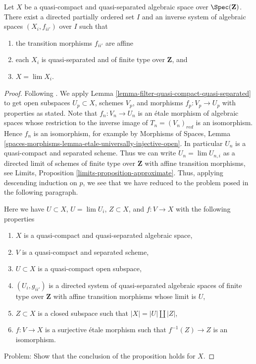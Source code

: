 \begin{proposition}
\label{proposition-approximate}
Let $X$ be a quasi-compact and quasi-separated algebraic space over
$\Spec(\mathbf{Z})$. There exist a directed partially ordered set $I$
and an inverse system of algebraic spaces $(X_i, f_{ii'})$ over $I$
such that
\begin{enumerate}
\item the transition morphisms $f_{ii'}$ are affine
\item each $X_i$ is quasi-separated and of finite type over
$\mathbf{Z}$, and
\item $X = \lim X_i$.
\end{enumerate}
\end{proposition}

\begin{proof}
Following \cite{CLO}. We apply Lemma
\ref{lemma-filter-quasi-compact-quasi-separated}
to get open subspaces $U_p \subset X$, schemes $V_p$, and morphisms
$f_p : V_p \to U_p$ with properties as stated. Note that
$f_n : V_n \to U_n$ is an \'etale morphism of algebraic spaces
whose restriction to the inverse image of $T_n = (V_n)_{red}$ is an
isomorphism. Hence $f_n$ is an isomorphism, for example by
Morphisms of Spaces, Lemma
\ref{spaces-morphisms-lemma-etale-universally-injective-open}.
In particular $U_n$ is a quasi-compact and separated scheme.
Thus we can write $U_n = \lim U_{n, i}$ as a directed limit
of schemes of finite type over $\mathbf{Z}$ with affine transition
morphisms, see Limits, Proposition \ref{limits-proposition-approximate}.
Thus, applying descending induction on $p$, we see that we have reduced
to the problem posed in the following paragraph.

\medskip\noindent
Here we have $U \subset X$, $U = \lim U_i$, $Z \subset X$, and
$f : V \to X$ with the following properties
\begin{enumerate}
\item $X$ is a quasi-compact and quasi-separated algebraic space,
\item $V$ is a quasi-compact and separated scheme,
\item $U \subset X$ is a quasi-compact open subspace,
\item $(U_i, g_{ii'})$ is a directed system of quasi-separated algebraic spaces
of finite type over $\mathbf{Z}$ with affine transition morphisms
whose limit is $U$,
\item $Z \subset X$ is a closed subspace such that $|X| = |U| \amalg |Z|$,
\item $f : V \to X$ is a surjective \'etale morphism such that
$f^{-1}(Z) \to Z$ is an isomorphism.
\end{enumerate}
Problem: Show that the conclusion of the proposition holds for $X$.


\end{proof}
